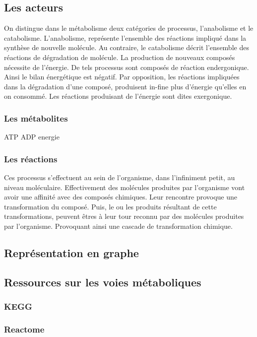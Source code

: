 \begin{refsection}
    \subsection{Les acteurs}
    
    On distingue dans le métabolisme deux catégories de processus, l'anabolisme et le catabolisme. L'anabolisme, représente l'ensemble des réactions impliqué dans la synthèse de nouvelle molécule. Au contraire, le catabolisme décrit l'ensemble des réactions de dégradation de molécule. La production de nouveaux composés nécessite de l'énergie. De tels processus sont composés de réaction endergonique. Ainsi le bilan énergétique est négatif. Par opposition, les réactions impliquées dans la dégradation d'une composé, produisent in-fine plus d'énergie qu'elles en on consommé. Les réactions produisant de l'énergie sont dites exergonique.
    
    \subsubsection{Les métabolites}
    ATP ADP energie
    
    
    \subsubsection{Les réactions}
    Ces processus s'effectuent au sein de l'organisme, dans l'infiniment petit, au niveau moléculaire. Effectivement des molécules produites par l'organisme vont avoir une affinité avec des composés chimiques. Leur rencontre provoque une transformation du composé. Puis, le ou les produits résultant de cette transformations, peuvent êtres à leur tour reconnu par des molécules produites par l'organisme. Provoquant ainsi une cascade de transformation chimique.
    
    \subsection{Représentation en graphe}
    \subsection{Ressources sur les voies métaboliques}
    \subsubsection{KEGG}
    \subsubsection{Reactome}

\end{refsection}
